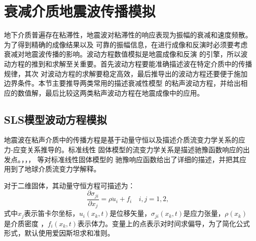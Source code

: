 \vspace{0.5cm}
\section{衰减介质地震波传播模拟}
\vspace{0.5cm}
地下介质普遍存在粘滞性，地震波对粘滞性的响应表现为振幅的衰减和速度频散。为了得到精确的成像结果以及
可靠的振幅信息，在进行成像和反演时必须要考虑衰减对地震波传播的影响。波动方程数值模拟是地震成像和反演
的引擎，所以波动方程的推到和求解至关重要。首先波动方程要能准确描述波在特定介质中的传播规律，其次
对波动方程的求解要稳定高效，最后推导出的波动方程还要便于施加边界条件。本节主要推导两类常用的描述衰减性模型
的粘声波动方程，并给出相应的数值解，最后比较这两类粘声波动方程在地震成像中的应用。

\subsection{SLS模型波动方程模拟}
地震波在粘声介质中的传播方程是基于动量守恒以及描述介质流变力学关系的应力-应变关系推导的。标准线性
固体模型的流变力学关系是描述驰豫函数响应的出发点。，，， 等对标准线性固体模型的
驰豫响应函数给出了详细的描述，并把其应用到了地球介质流变力学解释。

对于二维固体，其动量守恒方程可描述为：
\begin{equation}
	\frac{\partial\sigma_{ji}}{\partial x_j}=\rho\ddot{u}_i+f_i \quad i,j=1,2,
	\label{eq:dl}
\end{equation}
式中$x_j$表示笛卡尔坐标，$u_i(x_k,t)$是位移矢量，$\sigma_{ji}(x_k,t)$是应力张量，$\rho(x_k)$是介质密度
，$f_i(x_k,t)$表示体力。变量上的点表示对时间求偏导，为了简化公式形式，默认使用爱因斯坦求和准则。

